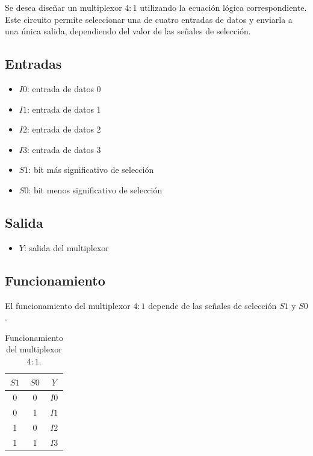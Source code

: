 \documentclass[a4paper,12pt]{article}
\begin{document}
Se desea diseñar un multiplexor $4:1$ utilizando la ecuación lógica correspondiente. Este circuito permite seleccionar una de cuatro entradas de datos y enviarla a una única salida, dependiendo del valor de las señales de selección.

\subsection{Entradas}

\begin{itemize}
	\item $I0$: entrada de datos 0
	\item $I1$: entrada de datos 1
	\item $I2$: entrada de datos 2
	\item $I3$: entrada de datos 3
	\item $S1$: bit más significativo de selección
	\item $S0$: bit menos significativo de selección
\end{itemize}

\subsection{Salida}

\begin{itemize}
	\item $Y$: salida del multiplexor
\end{itemize}

\subsection{Funcionamiento}

El funcionamiento del multiplexor $4:1$ depende de las señales de selección $S1$ y $S0$.

\begin{table}[h]
	\centering
	\begin{tabular}{|c|c|c|}
		\hline
		$S1$ & $S0$ & $Y$ \\ \hline
		0 & 0 & $I0$ \\ \hline
		0 & 1 & $I1$ \\ \hline
		1 & 0 & $I2$ \\ \hline
		1 & 1 & $I3$ \\ \hline
	\end{tabular}
	\caption{Funcionamiento del multiplexor $4:1$.}
	\label{tab:ej8_funcionamiento}
\end{table}
\end{document}
